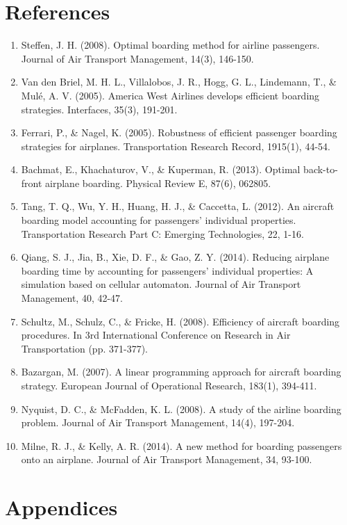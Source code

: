 \documentclass[12pt,a4paper]{article}
\begin{document}
\section{References}
\begin{enumerate}
\item Steffen, J. H. (2008). Optimal boarding method for airline passengers. Journal of Air Transport Management, 14(3), 146-150.
\item Van den Briel, M. H. L., Villalobos, J. R., Hogg, G. L., Lindemann, T., \& Mulé, A. V. (2005). America West Airlines develops efficient boarding strategies. Interfaces, 35(3), 191-201.
\item Ferrari, P., \& Nagel, K. (2005). Robustness of efficient passenger boarding strategies for airplanes. Transportation Research Record, 1915(1), 44-54.
\item Bachmat, E., Khachaturov, V., \& Kuperman, R. (2013). Optimal back-to-front airplane boarding. Physical Review E, 87(6), 062805.
\item Tang, T. Q., Wu, Y. H., Huang, H. J., \& Caccetta, L. (2012). An aircraft boarding model accounting for passengers' individual properties. Transportation Research Part C: Emerging Technologies, 22, 1-16.
\item Qiang, S. J., Jia, B., Xie, D. F., \& Gao, Z. Y. (2014). Reducing airplane boarding time by accounting for passengers' individual properties: A simulation based on cellular automaton. Journal of Air Transport Management, 40, 42-47.
\item Schultz, M., Schulz, C., \& Fricke, H. (2008). Efficiency of aircraft boarding procedures. In 3rd International Conference on Research in Air Transportation (pp. 371-377).
\item Bazargan, M. (2007). A linear programming approach for aircraft boarding strategy. European Journal of Operational Research, 183(1), 394-411.
\item Nyquist, D. C., \& McFadden, K. L. (2008). A study of the airline boarding problem. Journal of Air Transport Management, 14(4), 197-204.
\item Milne, R. J., \& Kelly, A. R. (2014). A new method for boarding passengers onto an airplane. Journal of Air Transport Management, 34, 93-100.
\end{enumerate}

\section{Appendices}
\end{document}
